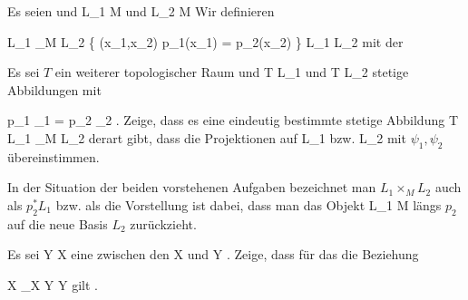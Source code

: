 {}
{

Es seien
und
 {L_1 } { M
} {}
und
 {L_2 } { M
} {}
Wir definieren

\mavergleichskettedisp
{\vergleichskette
{L_1 \times_M L_2
}
{ } { \left\{ (x_1,x_2)  \mid   p_1(x_1) = p_2(x_2)         \right\}
}
{ \subseteq} { L_1 \times L_2
}
{ } {
}
{ } {
}
}
{}{}{}
mit der
 {Es sei $T$ ein weiterer topologischer Raum und
 { T } { L_1
} {}
und
 { T } { L_2
} {}
stetige Abbildungen mit

\mavergleichskettedisp
{\vergleichskette
{ p_1 \circ \psi_1
}
{ =} { p_2 \circ \psi_2
}
{ } {
}
{ } {
}
{ } {}
}
{}{}{.}
Zeige, dass es eine eindeutig bestimmte stetige Abbildung
\maabbdisp {\psi} { T } { L_1 \times_M L_2
} {}
derart gibt, dass die Projektionen auf
\mathkor {} {L_1} {bzw.} {L_2} {}
mit $\psi_1,\psi_2$ übereinstimmen.
}

}
{} {}

In der Situation der beiden vorstehenen Aufgaben bezeichnet man $L_1 \times_M L_2$
 {} {}
auch als $p_2^*L_1$ bzw. als
 die Vorstellung ist dabei, dass man das Objekt
 {L_1} {M
} {}
längs $p_2$ auf die neue Basis $L_2$ zurückzieht.

{}
{

Es sei
 { Y } { X
} {}
eine
zwischen den
\mathkor {} {X} {und} {Y} {.}
Zeige, dass für das
die Beziehung

\mavergleichskettedisp
{\vergleichskette
{ X \times_X Y
}
{ \cong} { Y
}
{ } {
}
{ } {
}
{ } {
}
}
{}{}{}
gilt
 {} {.}

}
{} {}

